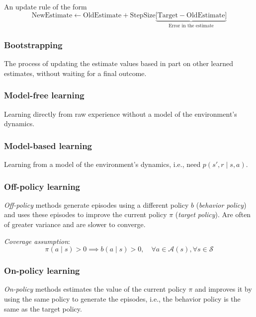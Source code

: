 An update rule of the form
\begin{equation}
    \text{NewEstimate} \leftarrow \text{OldEstimate} + \text{StepSize} \underbrace{ \Big[ \text{Target} - \text{OldEstimate} \Big] }_{\text{Error in the estimate}}
\end{equation}

\subsubsection{Bootstrapping}\label{sec:bootstrapping}

The process of updating the estimate values based in part on other learned estimates, without waiting for a final outcome.

\subsubsection{Model-free learning}\label{sec:model-free-learning}

Learning directly from raw experience without a model of the environment’s dynamics.

\subsubsection{Model-based learning}

Learning from a model of the environment’s dynamics, i.e., need \( p(s', r \mid s, a) \).

\subsubsection{Off-policy learning}

\textit{Off-policy} methods generate episodes using a different policy \( b \) (\textit{behavior policy}) and uses these episodes to improve the current policy \( \pi \) (\textit{target policy}).
Are often of greater variance and are slower to converge.

\textit{Coverage assumption}:
\begin{equation}
    \pi(a \mid s) > 0 \implies b(a \mid s) > 0, \quad \forall a \in \mathcal{A}(s), \forall s \in \mathcal{S}
\end{equation}

\subsubsection{On-policy learning}

\textit{On-policy} methods estimates the value of the current policy \( \pi \) and improves it by using the same policy to generate the episodes, i.e., the behavior policy is the same as the target policy.
